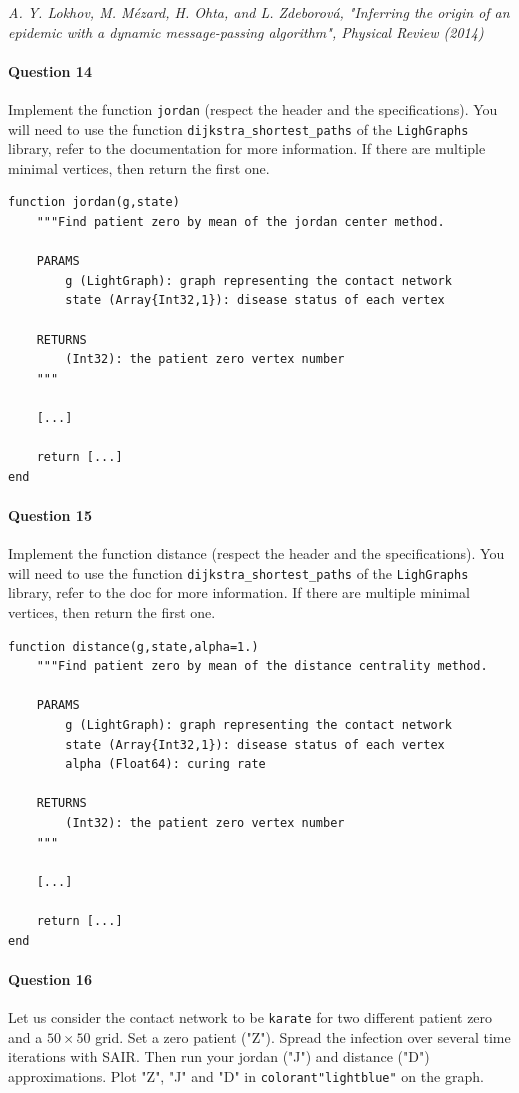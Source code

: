 \documentclass{article}
\begin{document}
\textit{A. Y. Lokhov, M. Mézard, H. Ohta, and L. Zdeborová, "Inferring the origin of an epidemic with a dynamic message-passing algorithm", Physical Review (2014)}

\medskip

\paragraph{Question 14} Implement the function \texttt{jordan} (respect the header and the specifications). You will need to use the function \texttt{dijkstra\_shortest\_paths} of the \texttt{LighGraphs} library, refer to the documentation for more information. If there are multiple minimal vertices, then return the first one.

\begin{verbatim}
function jordan(g,state)
    """Find patient zero by mean of the jordan center method.
    
    PARAMS
        g (LightGraph): graph representing the contact network
        state (Array{Int32,1}): disease status of each vertex
    
    RETURNS
        (Int32): the patient zero vertex number 
    """

    [...]

    return [...]
end
\end{verbatim}

\paragraph{Question 15} Implement the function distance (respect the header and the specifications). You will need to use the function \texttt{dijkstra\_shortest\_paths} of the \texttt{LighGraphs} library, refer to the doc for more information. If there are multiple minimal vertices, then return the first one.

\begin{verbatim}
function distance(g,state,alpha=1.)
    """Find patient zero by mean of the distance centrality method.
    
    PARAMS
        g (LightGraph): graph representing the contact network
        state (Array{Int32,1}): disease status of each vertex
        alpha (Float64): curing rate
    
    RETURNS
        (Int32): the patient zero vertex number 
    """

    [...]

    return [...]
end
\end{verbatim}

\paragraph{Question 16} Let us consider the contact network to be \texttt{karate} for two different patient zero and a $50 \times 50$ grid. Set a zero patient ("Z"). Spread the infection over several time iterations with SAIR. Then run your jordan ("J") and distance ("D") approximations. Plot "Z", "J" and "D" in \texttt{colorant"lightblue"} on the graph.
\end{document}
